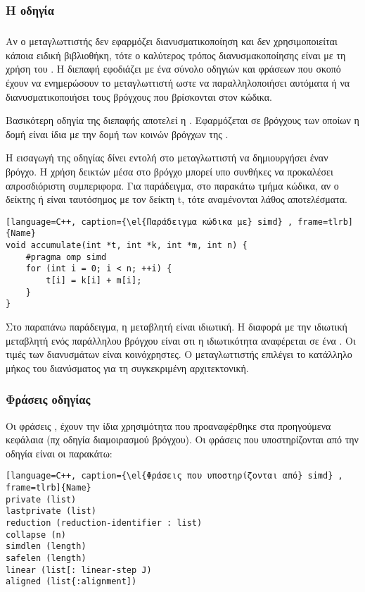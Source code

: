 \clearpage
\subsubsection{Η οδηγία \emph{}}
\subparagraph{}
Αν ο μεταγλωττιστής δεν εφαρμόζει διανυσματικοποίηση και δεν χρησιμοποιείται κάποια ειδική βιβλιοθήκη, τότε ο καλύτερος τρόπος διανυσμακοποίησης είναι με τη χρήση του \emph{}.
Η διεπαφή εφοδιάζει με ένα σύνολο οδηγιών και φράσεων που σκοπό έχουν να ενημερώσουν το μεταγλωττιστή ωστε να παραλληλοποιήσει αυτόματα ή να διανυσματικοποιήσει τους βρόγχους που βρίσκονται στον κώδικα.

Βασικότερη οδηγία της διεπαφής αποτελεί η \textbf{\emph{}}. Εφαρμόζεται σε βρόγχους των οποίων η δομή είναι ίδια με την δομή των κοινών βρόγχων της \emph{}. 

Η εισαγωγή της οδηγίας \emph{} δίνει εντολή στο μεταγλωττιστή να δημιουργήσει έναν \emph{} βρόγχο.
Η χρήση δεικτών μέσα στο βρόγχο μπορεί υπο συνθήκες να προκαλέσει απροσδιόριστη συμπεριφορα. Για παράδειγμα, στο παρακάτω τμήμα κώδικα, αν ο δείκτης \emph{} ή \emph{} είναι ταυτόσημος με τον δείκτη t, τότε αναμένονται λάθος αποτελέσματα.
\ \\

\begin{lstlisting}[language=C++, caption={\el{Παράδειγμα κώδικα με} simd} , frame=tlrb]{Name}
void accumulate(int *t, int *k, int *m, int n) {
	#pragma omp simd
	for (int i = 0; i < n; ++i) {
		t[i] = k[i] + m[i];
	}
}
\end{lstlisting}

\clearpage
Στο παραπάνω παράδειγμα, η μεταβλητή \emph{} είναι ιδιωτική. Η διαφορά με την ιδιωτική μεταβλητή ενός παράλληλου βρόγχου είναι οτι η ιδιωτικότητα αναφέρεται σε ένα \emph{}. Oι τιμές των διανυσμάτων \emph{} είναι κοινόχρηστες. Ο μεταγλωττιστής επιλέγει το κατάλληλο μήκος του διανύσματος για τη συγκεκριμένη αρχιτεκτονική. 

\subsubsection{Φράσεις οδηγίας \emph{}}
Οι φράσεις \emph{}, έχουν την ίδια χρησιμότητα που προαναφέρθηκε στα προηγούμενα κεφάλαια (πχ οδηγία διαμοιρασμού βρόγχου).
Οι φράσεις που υποστηρίζονται από την οδηγία είναι οι παρακάτω:
\begin{lstlisting}[language=C++, caption={\el{Φράσεις που υποστηρίζονται από} simd} , frame=tlrb]{Name}
private (list)
lastprivate (list)
reduction (reduction-identifier : list)
collapse (n)
simdlen (length)
safelen (length)
linear (list[: linear-step J)
aligned (list{:alignment])
\end{lstlisting}
\ \\

